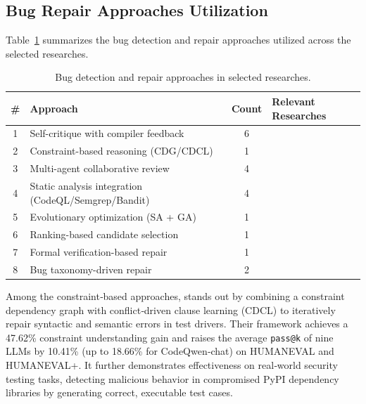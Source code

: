 \documentclass[11pt,a4paper]{article}
\begin{document}
\subsection{Bug Repair Approaches Utilization}
\label{sec:repair_results}

Table~\ref{tab:repair_approaches} summarizes the bug detection and repair approaches utilized across the selected researches.

\begin{table}[H]
\centering
\caption{Bug detection and repair approaches in selected researches.}
\label{tab:repair_approaches}
\small
\begin{tabular}{@{}clcp{7cm}@{}}
\toprule
\textbf{\#} & \textbf{Approach} & \textbf{Count} & \textbf{Relevant Researches} \\
\midrule
1 & Self-critique with compiler feedback & 6 & \cite{dou2026,chen2023selfdebug,wang2024intervenor,zhang2024copilot,bai2025agent,ding2025codingcare} \\
2 & Constraint-based reasoning (CDG/CDCL) & 1 & \cite{liu2025llm4tdg} \\
3 & Multi-agent collaborative review & 4 & \cite{bai2025agent,zhang2025anncoder,ding2025codingcare,frenkel2025apr} \\
4 & Static analysis integration (CodeQL/Semgrep/Bandit) & 4 & \cite{bruni2025,ding2025codingcare,nazzal2024promsec,zhao2025semopt} \\
5 & Evolutionary optimization (SA + GA) & 1 & \cite{zhang2025anncoder} \\
6 & Ranking-based candidate selection & 1 & \cite{lyu2025toppass} \\
7 & Formal verification-based repair & 1 & \cite{frenkel2025apr} \\
8 & Bug taxonomy-driven repair & 2 & \cite{dou2026,zhang2024copilot} \\
\bottomrule
\end{tabular}
\end{table}

Among the constraint‑based approaches, \cite{liu2025llm4tdg} stands out by combining a constraint dependency graph with conflict‑driven clause learning (CDCL) to iteratively repair syntactic and semantic errors in test drivers. Their framework achieves a 47.62\% constraint understanding gain and raises the average \texttt{pass@k} of nine LLMs by 10.41\% (up to 18.66\% for CodeQwen‑chat) on HUMANEVAL and HUMANEVAL+. It further demonstrates effectiveness on real‑world security testing tasks, detecting malicious behavior in compromised PyPI dependency libraries by generating correct, executable test cases.
\end{document}
